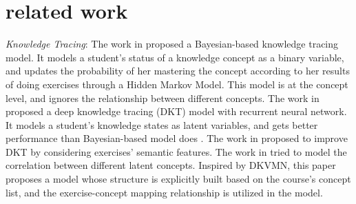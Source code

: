 \documentclass{edm_template}
\begin{document}
\begin{itemize}

\end{itemize}

\section{related work}

\emph{Knowledge Tracing}:
The work in \cite{bkt} proposed a Bayesian-based knowledge tracing model. It models a student's status of a knowledge concept as a binary variable, and updates the probability of her mastering the concept according to her results of doing exercises through a Hidden Markov Model. This model is at the concept level, and ignores the relationship between different concepts. The work in \cite{dkt} proposed a deep knowledge tracing (DKT) model with recurrent neural network. It models a student's knowledge states as latent variables, and gets better performance than Bayesian-based model does \cite{hdd}.
The work in \cite{ees} proposed to improve DKT by considering exercises' semantic features. The work in \cite{dkvmn} tried to model the correlation between different latent concepts. Inspired by DKVMN, this paper proposes a model whose structure is explicitly built based on the course's concept list, and the exercise-concept mapping relationship is utilized in the model.

\end{document}
